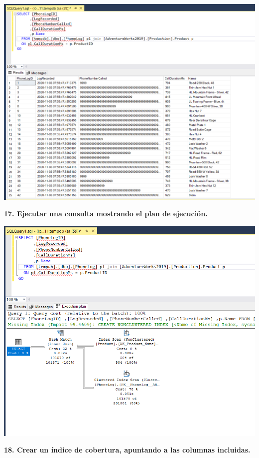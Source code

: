\documentclass{article}
\begin{document}
    \begin{center}
		\includegraphics[width=15cm]{./images/20} 
	\end{center}
	\newpage
\textbf{17. Ejecutar una consulta mostrando el plan de ejecución.}

    \begin{center}
		\includegraphics[width=15cm]{./images/21} 
	\end{center}
	\newpage
\textbf{18. Crear un índice de cobertura, apuntando a las columnas incluidas.}
\end{document}
